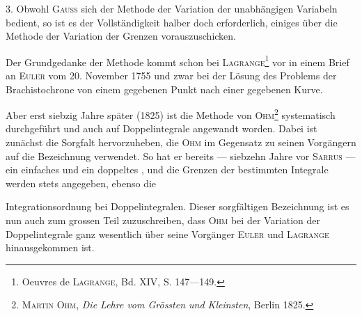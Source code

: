 \clearpage\begingroup\NoSourceHead
\makeatletter\tagsleft@true\let\veqno\@@leqno\makeatother
\renewcommand{\thefootnote}{\arabic{footnote})}\setcounter{footnote}{5}
\noindent\hspace*{\parindent}3. Obwohl \textsc{Gauss} sich der Methode der Variation der unabhängigen
Variabeln bedient, so ist es der Vollständigkeit halber doch erforderlich,
einiges über die Methode der Variation der Grenzen vorauszuschicken.

Der Grundgedanke der Methode kommt schon bei \textsc{Lagrange}\footnote{Oeuvres de \textsc{Lagrange}, Bd. XIV, S. 147—149.} vor in
einem Brief an \textsc{Euler} vom 20. November 1755 und zwar bei der Lösung des
Problems der Brachistochrone von einem gegebenen Punkt nach einer gegebenen
Kurve.

Aber erst siebzig Jahre später (1825) ist die Methode von \textsc{Ohm}\footnote{\textsc{Martin Ohm}, \textit{Die Lehre vom Grössten und Kleinsten}, Berlin 1825.} systematisch
durchgeführt und auch auf Doppelintegrale angewandt worden. Dabei
ist zunächst die Sorgfalt hervorzuheben, die \textsc{Ohm} im Gegensatz zu seinen Vorgängern
auf die Bezeichnung verwendet. So hat er bereits — siebzehn Jahre
vor \textsc{Sarrus} — ein einfaches und ein doppeltes , und
die Grenzen der bestimmten Integrale werden stets angegeben, ebenso die
\par\clearpage{}
\noindent Integrationsordnung bei Doppelintegralen. Dieser sorgfältigen Bezeichnung
ist es nun auch zum grossen Teil zuzuschreiben, dass \textsc{Ohm} bei der Variation
der Doppelintegrale ganz wesentlich über seine Vorgänger \textsc{Euler} und \textsc{Lagrange}
hinausgekommen ist.

